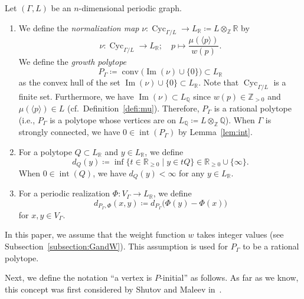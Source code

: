 \documentclass[ALCO,published]{cedram}
\theoremstyle{remark}
\begin{document}
\begin{defi}\label{defi:P}
Let $(\Gamma , L)$ be an $n$-dimensional periodic graph. 
\begin{enumerate}
\item 
We define the \textit{normalization map} 
$\nu : \operatorname{Cyc}_{\Gamma /L} \to L_{\mathbb{R}} \coloneqq  L \otimes _{\mathbb{Z}} \mathbb{R}$ by 
\[
\nu: \operatorname{Cyc}_{\Gamma /L} \to L_{\mathbb{R}}; \quad p \mapsto \frac{\mu(\langle p \rangle )}{w(p)}. 
\]
We define the \textit{growth polytope}
\[
P_{\Gamma} \coloneqq  \operatorname{conv} \bigl( \operatorname{Im}(\nu) \cup \{ 0 \} \bigr) \subset L_{\mathbb{R}}
\]
as the convex hull of the set 
$\operatorname{Im}(\nu) \cup \{ 0 \} \subset L_{\mathbb{R}}$. 
Note that $\operatorname{Cyc}_{\Gamma /L}$ is a finite set. 
Furthermore, we have $\operatorname{Im}(\nu) \subset L_{\mathbb{Q}}$ since $w(p) \in \mathbb{Z}_{>0}$ and $\mu(\langle p \rangle ) \in L$ (cf.\ Definition~\ref{defi:mu}). 
Therefore, $P_{\Gamma}$ is a rational polytope 
(i.e., $P_{\Gamma}$ is a polytope whose vertices are on $L_{\mathbb{Q}} \coloneqq  L \otimes _{\mathbb{Z}} \mathbb{Q}$). 
When $\Gamma$ is strongly connected, we have $0 \in \operatorname{int}(P_{\Gamma})$ by Lemma~\ref{lem:int}. 
 
\item 
For a polytope $Q \subset L_{\mathbb{R}}$ and $y \in L_{\mathbb{R}}$, we define 
\[
d_{Q}(y) \coloneqq  \inf \{ t \in \mathbb{R}_{\ge 0} \mid y \in t Q \} \in \mathbb{R}_{\ge 0} \cup \{ \infty \}. 
\]
When $0 \in \operatorname{int}(Q)$, 
we have $d_{Q}(y) < \infty$ for any $y \in L_{\mathbb{R}}$. 

\item
For a periodic realization $\Phi\colon V_{\Gamma} \to L_{\mathbb{R}}$, we define 
\[
d_{P_{\Gamma}, \Phi}(x, y) \coloneqq  d_{P_{\Gamma}}\bigl( \Phi(y) - \Phi(x) \bigr)
\]
for $x, y \in V_{\Gamma}$. 
\end{enumerate}
\end{defi}

\begin{rmk}
In this paper, we assume that the weight function $w$ takes integer values (see Subsection~\ref{subsection:GandW}). 
This assumption is used for $P_{\Gamma}$ to be a rational polytope. 
\end{rmk}


Next, we define the notation ``a vertex is $P$-initial'' as follows. 
As far as we know, this concept was first considered by Shutov and Maleev in~\cite{SM19}.
\end{document}
